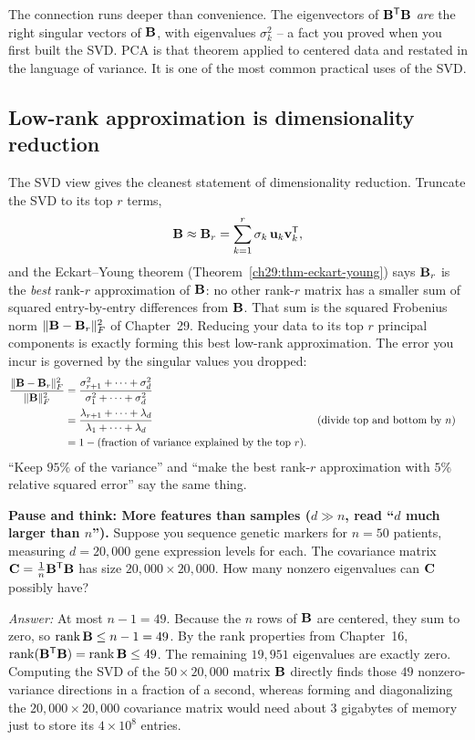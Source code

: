 \begin{remark}
The connection runs deeper than convenience. The eigenvectors of $\mathbf{B}^{\mathsf{T}}\mathbf{B}$
\emph{are} the right singular vectors of $\mathbf{B}$, with eigenvalues $\sigma_k^2$ --
a fact you proved when you first built the SVD. PCA is that theorem applied
to centered data and restated in the language of variance. It is one of the most
common practical uses of the SVD.
\end{remark}

\subsection{Low-rank approximation is dimensionality reduction}

The SVD view gives the cleanest statement of dimensionality reduction. Truncate the
SVD to its top $r$ terms,
\[
  \mathbf{B} \approx \mathbf{B}_r=\sum_{k=1}^r \sigma_k\,\mathbf{u}_k\mathbf{v}_k^{\mathsf{T}} ,
\]
and the Eckart--Young theorem (Theorem~\ref{ch29:thm-eckart-young}) says $\mathbf{B}_r$ is the
\emph{best} rank-$r$ approximation of $\mathbf{B}$: no other rank-$r$ matrix has a smaller
sum of squared entry-by-entry differences from $\mathbf{B}$. That sum is the squared
Frobenius norm $\lVert\mathbf{B}-\mathbf{B}_r\rVert_F^2$ of Chapter~29. Reducing your data to its top $r$ principal
components is exactly forming this best low-rank approximation. The error you incur
is governed by the singular values you dropped:
\begin{align*}
  \frac{\lVert\mathbf{B}-\mathbf{B}_r\rVert_F^2}{\lVert\mathbf{B}\rVert_F^2}
  &=\frac{\sigma_{r+1}^2+\cdots+\sigma_d^2}{\sigma_1^2+\cdots+\sigma_d^2}\\
  &=\frac{\lambda_{r+1}+\cdots+\lambda_d}{\lambda_1+\cdots+\lambda_d}
   &&\text{(divide top and bottom by $n$)}\\
  &=1-(\text{fraction of variance explained by the top $r$}).
\end{align*}
``Keep $95\%$ of the variance'' and ``make the best rank-$r$ approximation with
$5\%$ relative squared error'' say the same thing.

\begin{recoverybox}
\textbf{Pause and think: More features than samples ($d \gg n$, read ``$d$ much
larger than $n$'').}
Suppose you sequence genetic markers for $n=50$ patients, measuring $d=20{,}000$
gene expression levels for each. The covariance matrix $\mathbf{C} = \tfrac1n\mathbf{B}^{\mathsf{T}}\mathbf{B}$
has size $20{,}000\times 20{,}000$. How many nonzero eigenvalues can $\mathbf{C}$
possibly have?
\smallskip

\emph{Answer:} At most $n-1 = 49$. Because the $n$ rows of $\mathbf{B}$ are centered,
they sum to zero, so $\operatorname{rank}\mathbf{B} \le n-1 = 49$. By the rank properties from
Chapter~16, $\operatorname{rank}(\mathbf{B}^{\mathsf{T}}\mathbf{B}) = \operatorname{rank}\mathbf{B} \le 49$. The remaining $19{,}951$
eigenvalues are exactly zero. Computing the SVD of the $50\times 20{,}000$ matrix
$\mathbf{B}$ directly finds those $49$ nonzero-variance directions in a fraction of a
second, whereas forming and diagonalizing the $20{,}000\times 20{,}000$ covariance
matrix would need about $3$ gigabytes of memory just to store its
$4\times10^8$ entries.
\end{recoverybox}

